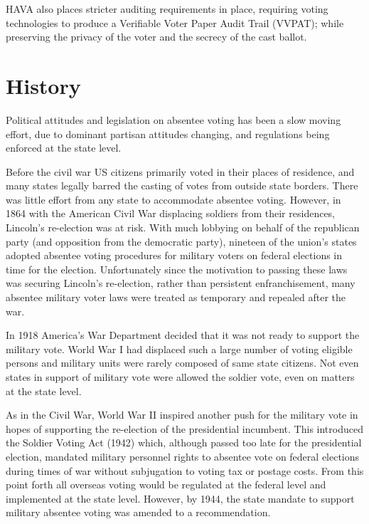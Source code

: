 HAVA also places stricter auditing requirements in place, requiring voting technologies to produce a Verifiable Voter Paper Audit Trail (VVPAT); while preserving the privacy of the voter and the secrecy of the cast ballot.


\section{History}
Political attitudes and legislation on absentee voting has been a slow moving effort, due to dominant partisan attitudes changing, and regulations being enforced at the state level.

Before the civil war US citizens primarily voted in their places of residence, and many states legally barred the casting of votes from outside state borders. There was little effort from any state to accommodate absentee voting. However, in 1864 with the American Civil War displacing soldiers from their residences, Lincoln's re-election was at risk. With much lobbying on behalf of the republican party (and opposition from the democratic party), nineteen of the union's states adopted absentee voting procedures for military voters on federal elections in time for the election. Unfortunately since the motivation to passing these laws was securing Lincoln's re-election, rather than persistent enfranchisement, many absentee military voter laws were treated as temporary and repealed after the war.

In 1918 America's War Department decided that it was not ready to support the military vote. World War I had displaced such a large number of voting eligible persons and military units were rarely composed of same state citizens. Not even states in support of military vote were allowed the soldier vote, even on matters at the state level.

As in the Civil War, World War II inspired another push for the military vote in hopes of supporting the re-election of the presidential incumbent. This introduced the Soldier Voting Act (1942) which, although passed too late for the presidential election, mandated military personnel rights to absentee vote on federal elections during times of war without subjugation to voting tax or postage costs. From this point forth all overseas voting would be regulated at the federal level and implemented at the state level. However, by 1944, the state mandate to support military absentee voting was amended to a recommendation.


